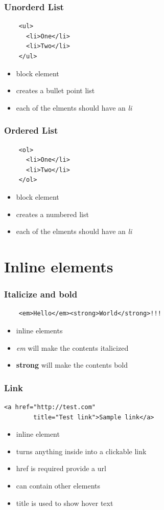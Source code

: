 \documentclass{beamer}
\begin{document}
\begin{frame}[fragile]
  \frametitle{Unorderd List}
  \begin{lstlisting}
    <ul>
      <li>One</li>
      <li>Two</li>
    </ul>
  \end{lstlisting}
  \begin{itemize}
    \item block element
    \item creates a bullet point list
    \item each of the elments should have an \textit{li}
  \end{itemize}
\end{frame}

\begin{frame}[fragile]
  \frametitle{Ordered List}
  \begin{lstlisting}
    <ol>
      <li>One</li>
      <li>Two</li>
    </ol>
  \end{lstlisting}
  \begin{itemize}
    \item block element
    \item creates a numbered list
    \item each of the elments should have an \textit{li}
  \end{itemize}
\end{frame}

\section[Section]{Inline elements}

\begin{frame}[fragile]
  \frametitle{Italicize and bold}
  \begin{lstlisting}
    <em>Hello</em><strong>World</strong>!!!
  \end{lstlisting}
  \begin{itemize}
    \item inline elements
    \item \textit{em} will make the contents italicized
    \item \textbf{strong} will make the contents bold
  \end{itemize}
\end{frame}

\begin{frame}[fragile]
  \frametitle{Link}
  \begin{lstlisting}[basicstyle=\footnotesize]
    <a href="http://test.com"
        title="Test link">Sample link</a>
  \end{lstlisting}
  \begin{itemize}
    \item inline element
    \item turns anything inside into a clickable link
    \item href is required provide a url
    \item can contain other elements
    \item title is used to show hover text
  \end{itemize}
\end{frame}
\end{document}
